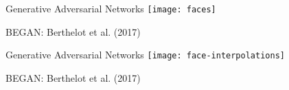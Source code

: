 %
%

\begin{slide}{Generative Adversarial Networks}
  \texttt{[image: faces]}

  \scriptsize
  BEGAN: Berthelot et al. (2017)
\end{slide}

%

\begin{slide}{Generative Adversarial Networks}
  \texttt{[image: face-interpolations]}

  \scriptsize
  BEGAN: Berthelot et al. (2017)
\end{slide}

%
%
